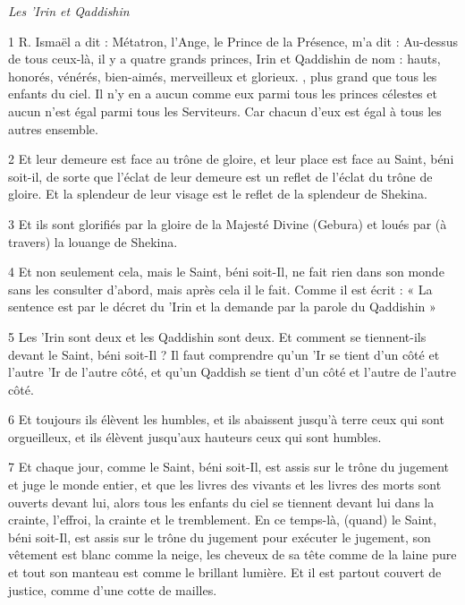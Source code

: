 
\par \textit{Les 'Irin et Qaddishin}

\par 1 R. Ismaël a dit : Métatron, l'Ange, le Prince de la Présence, m'a dit : Au-dessus de tous ceux-là, il y a quatre grands princes, Irin et Qaddishin de nom : hauts, honorés, vénérés, bien-aimés, merveilleux et glorieux. , plus grand que tous les enfants du ciel. Il n’y en a aucun comme eux parmi tous les princes célestes et aucun n’est égal parmi tous les Serviteurs. Car chacun d’eux est égal à tous les autres ensemble.

\par 2 Et leur demeure est face au trône de gloire, et leur place est face au Saint, béni soit-il, de sorte que l'éclat de leur demeure est un reflet de l'éclat du trône de gloire. Et la splendeur de leur visage est le reflet de la splendeur de Shekina.

\par 3 Et ils sont glorifiés par la gloire de la Majesté Divine (Gebura) et loués par (à travers) la louange de Shekina.

\par 4 Et non seulement cela, mais le Saint, béni soit-Il, ne fait rien dans son monde sans les consulter d'abord, mais après cela il le fait. Comme il est écrit : « La sentence est par le décret du 'Irin et la demande par la parole du Qaddishin »

\par 5 Les 'Irin sont deux et les Qaddishin sont deux. Et comment se tiennent-ils devant le Saint, béni soit-Il ? Il faut comprendre qu'un 'Ir se tient d'un côté et l'autre 'Ir de l'autre côté, et qu'un Qaddish se tient d'un côté et l'autre de l'autre côté.

\par 6 Et toujours ils élèvent les humbles, et ils abaissent jusqu'à terre ceux qui sont orgueilleux, et ils élèvent jusqu'aux hauteurs ceux qui sont humbles.

\par 7 Et chaque jour, comme le Saint, béni soit-Il, est assis sur le trône du jugement et juge le monde entier, et que les livres des vivants et les livres des morts sont ouverts devant lui, alors tous les enfants du ciel se tiennent devant lui dans la crainte, l'effroi, la crainte et le tremblement. En ce temps-là, (quand) le Saint, béni soit-Il, est assis sur le trône du jugement pour exécuter le jugement, son vêtement est blanc comme la neige, les cheveux de sa tête comme de la laine pure et tout son manteau est comme le brillant lumière. Et il est partout couvert de justice, comme d'une cotte de mailles.

